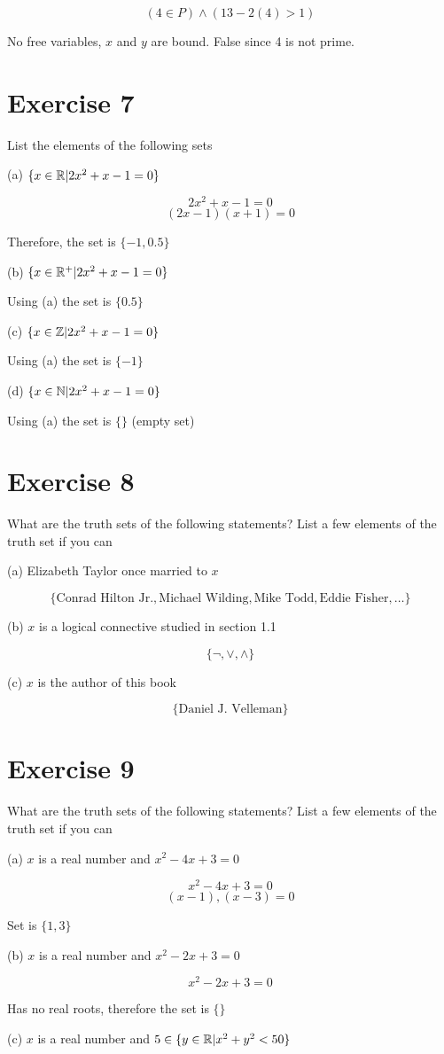 \documentclass[11pt]{article}
\begin{document}
$$(4 \in P) \wedge (13 - 2(4) > 1)$$

No free variables, $x$ and $y$ are bound. False since 4 is not prime.

\section*{Exercise 7}

List the elements of the following sets

\noindent (a) $\{x \in \mathbb{R} \text{\textbar} 2x^2 + x - 1 = 0 \}$

$$2x^2 + x - 1 = 0 $$
$$(2x -1)(x+1)=0$$

Therefore, the set is $\{-1, 0.5\}$

\noindent (b) $\{x \in \mathbb{R}^+ \text{\textbar} 2x^2 + x - 1 = 0 \}$

Using (a) the set is $\{0.5\}$

\noindent (c) $\{x \in \mathbb{Z} \text{\textbar} 2x^2 + x - 1 = 0 \}$

Using (a) the set is $\{-1\}$

\noindent (d) $\{x \in \mathbb{N} \text{\textbar} 2x^2 + x - 1 = 0 \}$

Using (a) the set is $\{\}$ (empty set)

\section*{Exercise 8}

What are the truth sets of the following statements? List a few elements of the truth set if you can

\noindent (a) Elizabeth Taylor once married to $x$

$$\{\text{Conrad Hilton Jr.}, \text{Michael Wilding}, \text{Mike Todd}, \text{Eddie Fisher}, \dots \}$$

\noindent (b) $x$ is a logical connective studied in section 1.1

$$\{\neg, \vee, \wedge \}$$

\noindent (c) $x$ is the author of this book

$$\{\text{Daniel J. Velleman}\}$$

\section*{Exercise 9}

What are the truth sets of the following statements? List a few elements of the truth set if you can

\noindent (a) $x$ is a real number and $x^2 -4x + 3 = 0$

$$x^2 -4x + 3 = 0$$
$$(x-1),(x-3) = 0$$

Set is $\{1,3\}$

\noindent (b) $x$ is a real number and $x^2 -2x + 3 = 0$

$$x^2 -2x + 3 = 0$$

Has no real roots, therefore the set is $\{\}$

\noindent (c) $x$ is a real number and $5 \in \{y \in \mathbb{R} \text{\textbar} x^2 + y^2 < 50 \}$

\end{document}

